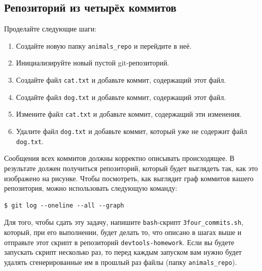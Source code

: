 \documentclass{article}
\begin{document}
\subsection{Репозиторий из четырёх коммитов}
\begin{minipage}{0.7\linewidth}
Проделайте следующие шаги:
\begin{enumerate}
\item Создайте новую папку \texttt{animals\_repo} и перейдите в неё.
\item Инициализируйте новый пустой git-репозиторий.
\item Создайте файл \texttt{cat.txt} и добавьте коммит, содержащий этот файл.
\item Создайте файл \texttt{dog.txt} и добавьте коммит, содержащий этот файл.
\item Измените файл \texttt{cat.txt} и добавьте коммит, содержащий эти изменения.
\item Удалите файл \texttt{dog.txt} и добавьте коммит, который уже не содержит файл \texttt{dog.txt}.
\end{enumerate}
Сообщения всех коммитов должны корректно описывать происходящее.
В результате должен получиться репозиторий, который будет выглядеть так, как это изображено на рисунке.
Чтобы посмотреть, как выглядит граф коммитов вашего репозитория, можно использовать следующую команду:
\begin{lstlisting}[style=csMiptBash]
$ git log --oneline --all --graph
\end{lstlisting}

Для того, чтобы сдать эту задачу, напишите \texttt{bash}-скрипт \texttt{3four\_commits.sh}, который, при его выполнении, будет делать то, что описано в шагах выше и отправьте этот скрипт в репозиторий \texttt{devtools-homework}. Если вы будете запускать скрипт несколько раз, то перед каждым запуском вам нужно будет удалять сгенерированные им в прошлый раз файлы (папку \texttt{animals\_repo}).
\end{minipage}
\end{document}
